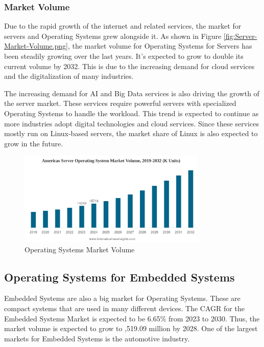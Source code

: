 \subsubsection{Market Volume}

Due to the rapid growth of the internet and related services, the market for servers and Operating Systems grew alongside it. 
As shown in Figure \ref{fig:Server-Market-Volume.png}, the market volume for Operating Systems for Servers has been steadily growing over the last years.
It's expected to grow to double its current volume by 2032. This is due to the increasing demand for cloud services and the digitalization of many industries.

The increasing demand for AI and Big Data services is also driving the growth of the server market. These services require powerful servers with specialized Operating Systems to handle the workload.
This trend is expected to continue as more industries adopt digital technologies and cloud services. Since these services mostly run on Linux-based servers, the market share of Linux is also expected to grow in the future.

\begin{figure}[H]
    \centering
    \includegraphics[width=0.8\textwidth]{figures/Server-Market-Volume.png}
    \caption{Operating Systems Market Volume}
    \label{fig:Operating_Systems_for_Servers_Market_Share}
\end{figure}

\cite{ServerOsMarketShare2}

\subsection{Operating Systems for Embedded Systems}

Embedded Systems are also a big market for Operating Systems. These are compact systems that are used in many different devices.
The CAGR for the Embedded Systems Market is expected to be 6.65\% from 2023 to 2030. Thus, the market volume is expected to grow to ,519.09 million by 2028.
One of the largest markets for Embedded Systems is the automotive industry. 

